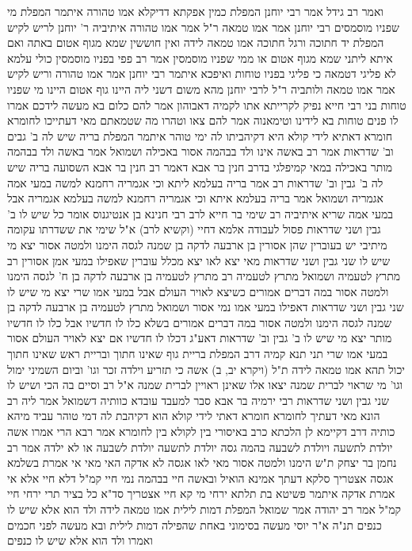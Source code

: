\documentclass[12pt, openany]{book}
\begin{document}
{ואמר רב גידל אמר רבי יוחנן המפלת כמין אפקתא דדיקלא אמו טהורה 
איתמר המפלת מי שפניו מוסמסים רבי יוחנן אמר אמו טמאה ר"ל אמר אמו טהורה 
איתיביה ר' יוחנן לריש לקיש המפלת יד חתוכה ורגל חתוכה אמו טמאה לידה ואין חוששין שמא מגוף אטום באתה ואם איתא ליתני שמא מגוף אטום או ממי שפניו מוסמסין 
אמר רב פפי בפניו מוסמסין כולי עלמא לא פליגי דטמאה כי פליגי בפניו טוחות ואיפכא איתמר רבי יוחנן אמר אמו טהורה וריש לקיש אמר אמו טמאה 
ולותביה ר"ל לרבי יוחנן מהא משום דשני ליה היינו גוף אטום היינו מי שפניו טוחות 
בני רבי חייא נפיק לקרייתא אתו לקמיה דאבוהון אמר להם  כלום בא מעשה לידכם אמרו לו פנים טוחות בא לידינו וטימאנוה 
אמר להם צאו וטהרו מה שטמאתם מאי דעתייכו לחומרא חומרא דאתיא לידי קולא היא דקיהביתו לה ימי טוהר 
איתמר המפלת בריה שיש לה ב' גבים וב' שדראות אמר רב באשה אינו ולד בבהמה אסור באכילה ושמואל אמר באשה ולד בבהמה מותר באכילה 
במאי קמיפלגי בדרב חנין בר אבא דאמר רב חנין בר אבא השסועה בריה שיש לה ב' גבין וב' שדראות 
רב אמר בריה בעלמא ליתא וכי אגמריה רחמנא למשה במעי אמה אגמריה ושמואל אמר בריה בעלמא איתא וכי אגמריה רחמנא למשה בעלמא אגמריה אבל במעי אמה שריא 
איתיביה רב שימי בר חייא לרב רבי חנינא בן אנטיגנוס אומר כל שיש לו ב' גבין ושני שדראות פסול לעבודה אלמא דחיי (וקשיא לרב) א"ל שימי את ששדרתו עקומה 
מיתיבי יש בעוברין שהן אסורין בן ארבעה לדקה בן שמנה לגסה הימנו ולמטה אסור יצא מי שיש לו שני גבין ושני שדראות 
מאי יצא לאו יצא מכלל עוברין שאפילו במעי אמן אסורין 
רב מתרץ לטעמיה ושמואל מתרץ לטעמיה רב מתרץ לטעמיה בן ארבעה לדקה בן ח' לגסה הימנו ולמטה אסור 
במה דברים אמורים כשיצא לאויר העולם אבל במעי אמו שרי יצא מי שיש לו שני גבין ושני שדראות דאפילו במעי אמו נמי אסור
ושמואל מתרץ לטעמיה בן ארבעה לדקה בן שמנה לגסה הימנו ולמטה אסור במה דברים אמורים בשלא כלו לו חדשיו אבל כלו לו חדשיו מותר יצא מי שיש לו ב' גבין וב' שדראות דאע"ג דכלו לו חדשיו אם יצא לאויר העולם אסור במעי אמו שרי 
תני תנא קמיה דרב המפלת בריית גוף שאינו חתוך ובריית ראש שאינו חתוך יכול תהא אמו טמאה לידה ת"ל (ויקרא יב, ב) אשה כי תזריע וילדה זכר וגו' וביום השמיני ימול וגו'
מי שראוי לברית שמנה יצאו אלו שאינן ראויין לברית שמנה א"ל רב וסיים בה הכי ושיש לו שני גבין ושני שדראות 
רבי ירמיה בר אבא סבר למעבד עובדא כוותיה דשמואל אמר ליה רב הונא מאי דעתיך לחומרא חומרא דאתי לידי קולא הוא דקיהבת לה דמי טוהר עביד מיהא כותיה דרב דקיימא לן הלכתא כרב באיסורי בין לקולא בין לחומרא 
אמר רבא הרי אמרו אשה יולדת לתשעה ויולדת לשבעה בהמה גסה יולדת לתשעה יולדת לשבעה או לא ילדה 
אמר רב נחמן בר יצחק ת"ש הימנו ולמטה אסור מאי לאו אגסה לא אדקה 
האי מאי אי אמרת בשלמא אגסה אצטריך סלקא דעתך אמינא הואיל ובאשה חיי בבהמה נמי חיי קמ"ל דלא חיי 
אלא אי אמרת אדקה איתמר פשיטא בת תלתא ירחי מי קא חיי 
אצטריך סד"א כל בציר תרי ירחי חיי קמ"ל 
אמר רב יהודה אמר שמואל  המפלת דמות לילית אמו טמאה לידה ולד הוא אלא שיש לו כנפים תנ"ה א"ר יוסי מעשה בסימוני באחת שהפילה דמות לילית ובא מעשה לפני חכמים ואמרו ולד הוא אלא שיש לו כנפים 
}
\end{document}
